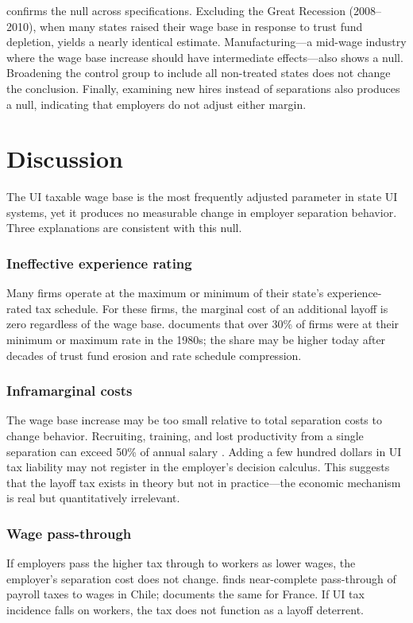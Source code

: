 \documentclass[12pt]{article}
\begin{document}


 confirms the null across specifications. Excluding the Great Recession (2008--2010), when many states raised their wage base in response to trust fund depletion, yields a nearly identical estimate. Manufacturing---a mid-wage industry where the wage base increase should have intermediate effects---also shows a null. Broadening the control group to include all non-treated states does not change the conclusion. Finally, examining new hires instead of separations also produces a null, indicating that employers do not adjust either margin.


\section{Discussion}

The UI taxable wage base is the most frequently adjusted parameter in state UI systems, yet it produces no measurable change in employer separation behavior. Three explanations are consistent with this null.

\subsubsection*{Ineffective experience rating}
Many firms operate at the maximum or minimum of their state's experience-rated tax schedule. For these firms, the marginal cost of an additional layoff is zero regardless of the wage base. \citet{anderson1993} documents that over 30\% of firms were at their minimum or maximum rate in the 1980s; the share may be higher today after decades of trust fund erosion and rate schedule compression.

\subsubsection*{Inframarginal costs}
The wage base increase may be too small relative to total separation costs to change behavior. Recruiting, training, and lost productivity from a single separation can exceed 50\% of annual salary \citep{boushey2012}. Adding a few hundred dollars in UI tax liability may not register in the employer's decision calculus. This suggests that the layoff tax exists in theory but not in practice---the economic mechanism is real but quantitatively irrelevant.

\subsubsection*{Wage pass-through}
If employers pass the higher tax through to workers as lower wages, the employer's separation cost does not change. \citet{gruber1997} finds near-complete pass-through of payroll taxes to wages in Chile; \citet{saez2019} documents the same for France. If UI tax incidence falls on workers, the tax does not function as a layoff deterrent.
\end{document}
